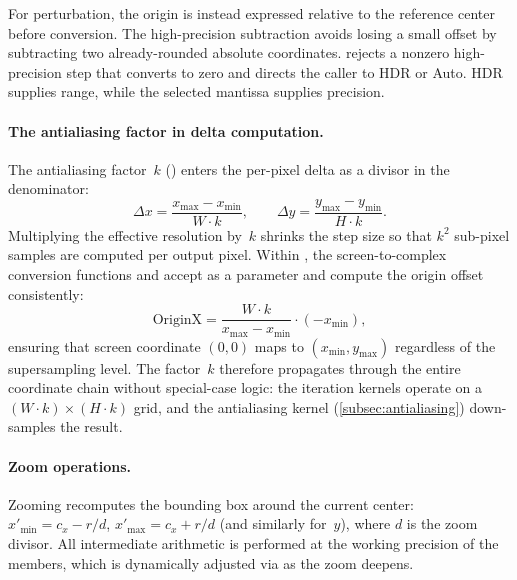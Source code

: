 For perturbation, the origin is instead expressed relative to the reference center
before conversion. The high-precision subtraction avoids losing a small offset by
subtracting two already-rounded absolute coordinates.  rejects
a nonzero high-precision step that converts to zero and directs the caller to HDR
or Auto. HDR supplies range, while the selected mantissa supplies precision.

\paragraph{The antialiasing factor in delta computation.}
\label{par:aa-delta}
The antialiasing factor~$k$ () enters the
per-pixel delta as a divisor in the denominator:
\[
  \Delta x = \frac{x_{\max} - x_{\min}}{W \cdot k}, \qquad
  \Delta y = \frac{y_{\max} - y_{\min}}{H \cdot k}.
\]
Multiplying the effective resolution by~$k$ shrinks the step size so
that $k^2$ sub-pixel samples are computed per output pixel.  Within
, the screen-to-complex conversion
functions  and 
accept  as a parameter and compute the origin
offset consistently:
\[
  \text{OriginX} = \frac{W \cdot k}{x_{\max} - x_{\min}}
                   \cdot (-x_{\min}),
\]
ensuring that screen coordinate $(0,0)$ maps to $(x_{\min}, y_{\max})$
regardless of the supersampling level.  The factor~$k$ therefore
propagates through the entire coordinate chain without special-case
logic: the iteration kernels operate on a
$(W\!\cdot\! k) \times (H\!\cdot\! k)$ grid, and the antialiasing
kernel (\cref{subsec:antialiasing}) down-samples the result.

\paragraph{Zoom operations.}
Zooming recomputes the bounding box around the current center:
$x'_{\min} = c_x - r/d$, $x'_{\max} = c_x + r/d$ (and similarly
for~$y$), where $d$ is the zoom divisor.  All intermediate arithmetic
is performed at the working precision of the 
members, which is dynamically adjusted via  as
the zoom deepens.


